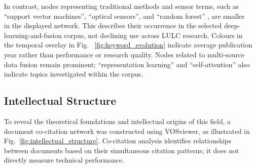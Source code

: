 \documentclass[]{interact}
\theoremstyle{plain}%
\theoremstyle{definition}
\theoremstyle{remark}
\DeclareRobustCommand{\DIFadd}[1]{{\protect\color{DIFaddcolor}\uwave{#1}}}
\DeclareRobustCommand{\DIFdel}[1]{{\protect\color{DIFdelcolor}\sout{#1}}}
\def\DIFadd#1{#1}%
\def\DIFdel#1{}%
\begin{document}
In contrast, nodes representing traditional methods \DIFadd{and} \DIFadd{sensor} \DIFadd{terms}, such as ``support vector \DIFdel{machines} \DIFadd{machines''},\DIFdel{''} ``optical \DIFdel{sensors} \DIFadd{sensors''},\DIFdel{''} and ``random forest'' \citep{belgiu2016random}\DIFadd{,} are smaller \DIFdel{and} \DIFdel{characterized} \DIFdel{by} \DIFdel{greener} \DIFdel{hues} \DIFadd{in} \DIFadd{the} \DIFadd{displayed} \DIFadd{network}\DIFadd{.} \DIFadd{This} \DIFadd{describes} \DIFadd{their} \DIFadd{occurrence} \DIFadd{in} \DIFadd{the} \DIFadd{selected} \DIFadd{deep-learning-and-fusion} \DIFadd{corpus}\DIFadd{,} \DIFadd{not} \DIFadd{declining} \DIFadd{use} \DIFadd{across} \DIFadd{LULC} \DIFadd{research}\DIFadd{.} \DIFadd{Colours} in the temporal overlay \DIFadd{in} \DIFadd{Fig}. \DIFdel{This} \DIFdel{suggests} \DIFdel{that} \DIFdel{while} \DIFdel{they} \DIFdel{remain} \DIFdel{essential} \DIFdel{baseline}\DIFadd{~}{\color{blue}\ref{fig:keyword_evolution} }\DIFadd{indicate} \DIFadd{average} \DIFadd{publication} \DIFadd{year} \DIFadd{rather} \DIFadd{than} \DIFadd{performance} or \DIFdel{complementary} \DIFdel{techniques}\DIFdel{,} \DIFdel{their} \DIFdel{relative} research \DIFdel{heat} \DIFdel{has} \DIFdel{declined} \DIFdel{compared} \DIFdel{to} \DIFdel{modern} \DIFdel{deep} \DIFdel{learning} \DIFdel{approaches} \DIFadd{quality}. \DIFdel{Meanwhile}\DIFdel{,} \DIFdel{nodes} \DIFadd{Nodes} related to multi-source data fusion \DIFdel{maintain} \DIFdel{a} \DIFdel{significant} \DIFdel{scale}\DIFdel{.} \DIFdel{This} \DIFdel{demonstrates} \DIFdel{that} \DIFdel{multi-source} \DIFdel{remote} \DIFdel{sensing} \DIFdel{data} \DIFdel{fusion} \DIFdel{remains} \DIFdel{a} \DIFdel{consistent} \DIFdel{research} \DIFdel{priority}\DIFdel{,} \DIFdel{increasingly} \DIFdel{coupled} \DIFdel{with} \DIFdel{deep} \DIFdel{learning} \DIFdel{in} \DIFdel{recent} \DIFdel{years}\DIFdel{.} \DIFdel{Furthermore}\DIFdel{,} \DIFdel{the} \DIFdel{appearance} \DIFdel{of} \DIFadd{remain} \DIFadd{prominent}\DIFadd{;} ``representation learning'' and ``self-attention'' \DIFdel{on} \DIFadd{also} \DIFadd{indicate} \DIFadd{topics} \DIFadd{investigated} \DIFadd{within} the \DIFdel{periphery} \DIFdel{of} \DIFdel{the} \DIFdel{network} \DIFdel{marks} \DIFdel{the} \DIFdel{latest} \DIFdel{frontiers} \DIFdel{in} \DIFdel{the} \DIFdel{transition} \DIFdel{toward} \DIFdel{advanced} \DIFdel{feature} \DIFdel{extraction} \DIFdel{and} \DIFdel{autonomous} \DIFdel{model} \DIFdel{adaptation} \DIFadd{corpus}.

\FloatBarrier
\subsection{Intellectual Structure}
To reveal the theoretical foundations and intellectual origins of this field, a document co-citation network was constructed using VOSviewer, as illustrated in Fig.~\ref{fig:intellectual_structure}. Co-citation analysis identifies \DIFdel{the} \DIFdel{semantic} relationships between documents based on their simultaneous citation patterns\DIFadd{;} \DIFadd{it} \DIFadd{does} \DIFadd{not} \DIFadd{directly} \DIFadd{measure} \DIFadd{technical} \DIFadd{performance}\DIFadd{.}
\end{document}
